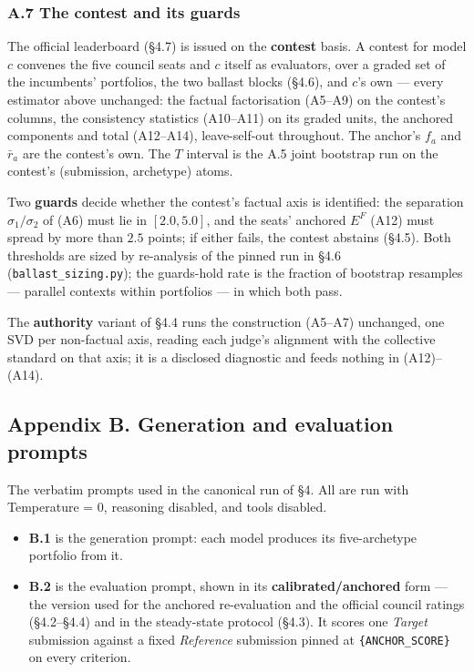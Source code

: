 \subsubsection{A.7 The contest and its guards}\label{a.7-the-contest-and-its-guards}

The official leaderboard (§4.7) is issued on the \textbf{contest} basis. A contest for model \(c\) convenes the five council seats and \(c\) itself as evaluators, over a graded set of the incumbents' portfolios, the two ballast blocks (§4.6), and \(c\)'s own --- every estimator above unchanged: the factual factorisation (A5--A9) on the contest's columns, the consistency statistics (A10--A11) on its graded units, the anchored components and total (A12--A14), leave-self-out throughout. The anchor's \(f_a\) and \(\bar r_a\) are the contest's own. The \(T\) interval is the A.5 joint bootstrap run on the contest's (submission, archetype) atoms.

Two \textbf{guards} decide whether the contest's factual axis is identified: the separation \(\sigma_1/\sigma_2\) of (A6) must lie in \([2.0, 5.0]\), and the seats' anchored \(E^{F}\) (A12) must spread by more than \(2.5\) points; if either fails, the contest abstains (§4.5). Both thresholds are sized by re-analysis of the pinned run in §4.6 (\texttt{ballast\_sizing.py}); the guards-hold rate is the fraction of bootstrap resamples --- parallel contexts within portfolios --- in which both pass.

The \textbf{authority} variant of §4.4 runs the construction (A5--A7) unchanged, one SVD per non-factual axis, reading each judge's alignment with the collective standard on that axis; it is a disclosed diagnostic and feeds nothing in (A12)--(A14).

\subsection{Appendix B. Generation and evaluation prompts}\label{appendix-b.-generation-and-evaluation-prompts}

The verbatim prompts used in the canonical run of §4. All are run with Temperature = 0, reasoning disabled, and tools disabled.

\begin{itemize}
\tightlist
\item
  \textbf{B.1} is the generation prompt: each model produces its five-archetype portfolio from it.
\item
  \textbf{B.2} is the evaluation prompt, shown in its \textbf{calibrated/anchored} form --- the version used for the anchored re-evaluation and the official council ratings (§4.2--§4.4) and in the steady-state protocol (§4.3). It scores one \emph{Target} submission against a fixed \emph{Reference} submission pinned at \texttt{\{ANCHOR\_SCORE\}} on every criterion.
\end{itemize}

